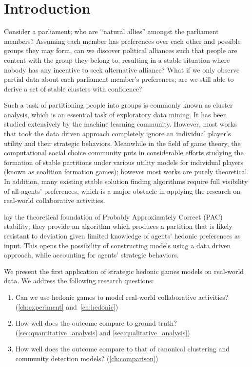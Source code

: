 
\chapter{Introduction}
\label{ch:intro}

Consider a parliament; who are ``natural allies'' amongst the parliament members?
Assuming each member has preferences over each other and possible groups they may
form, can we discover political alliances such that people are content with the 
group they belong to, resulting in a stable situation where nobody has any
incentive to seek alternative alliance?
What if we only observe partial data about each parliament member's preferences;
are we still able to derive a set of stable clusters with confidence? 

Such a task of partitioning people into groups is commonly known as cluster
analysis, which is an essential task of exploratory data mining.
It has been studied extensively by the machine learning community.
However, most works that took the data driven approach completely ignore an
individual player's utility and their strategic behaviors.
Meanwhile in the field of game theory, the computational social choice
community puts in considerable efforts studying the formation of stable
partitions under various utility models for individual players (known as
coalition formation games); however most works are purely theoretical.
In addition, many existing stable solution finding algorithms require full
visibility of all agents' preferences, which is a major obstacle in applying
the research on real-world collaborative activities.

 lay the theoretical foundation of Probably
Approximately Correct (PAC) stability; they provide an algorithm which
produces a partition that is likely resistant to deviation given limited
knowledge of agents' hedonic preferences as input.  
This opens the possibility of constructing models using a data driven
approach, while accounting for agents' strategic behaviors.

We present the first application of strategic hedonic games models on
real-world data.
We address the following research questions:
\begin{enumerate}
    \item Can we use hedonic games to model real-world collaborative
      activities? (\autoref{ch:experiment} and~\ref{ch:hedonic})
    \item How well does the outcome compare to ground truth?
      (\autoref{sec:quantitative_analysis}
      and \autoref{sec:qualitative_analysis})
    \item How well does the outcome compare to that of canonical clustering
      and community detection models? (\autoref{ch:comparison})
\end{enumerate}

